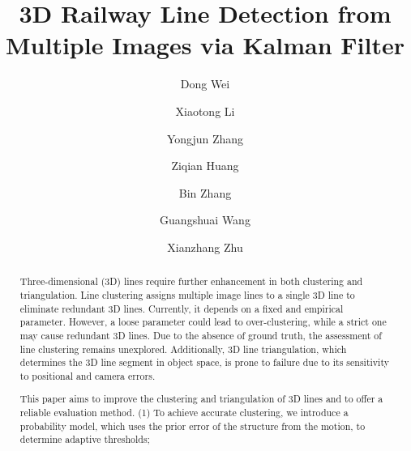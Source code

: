 \documentclass[a4paper]{cas-sc}
\begin{document}
\linenumbers
\let\WriteBookmarks\relax
\def\floatpagepagefraction{1}

\shorttitle{}

\title [mode = title]{3D Railway Line Detection from Multiple Images via Kalman Filter }                      


%
\author[1]{Dong Wei}
\fnmark[1]
\author[1]{Xiaotong Li}
\fnmark[1]
\author[1]{Yongjun Zhang}
\cormark[1]
\author[1]{Ziqian Huang}
\fnmark[1]
\author[1]{Bin Zhang}
\fnmark[1]
\author[1]{Guangshuai Wang}
\fnmark[1]
\author[1]{Xianzhang Zhu}
\fnmark[1]








\begin{abstract}
Three-dimensional (3D) lines require further enhancement in both clustering and triangulation. 
Line clustering assigns multiple image lines to a single 3D line to eliminate redundant 3D lines.
Currently, it depends on a fixed and empirical parameter.
However,
a loose parameter could lead to over-clustering, 
while a strict one may cause redundant 3D lines. 
Due to the absence of ground truth, 
the assessment of line clustering remains unexplored.
Additionally, 
3D line triangulation, 
which determines the 3D line segment in object space, 
is prone to failure due to its sensitivity to positional and camera errors.

\noindent This paper aims to improve the clustering and triangulation of 3D lines and to offer a reliable evaluation method. 
(1) To achieve accurate clustering, 
we introduce a probability model,
which uses the prior error of the structure from the motion,
to determine adaptive thresholds;
\end{abstract}
\end{document}
